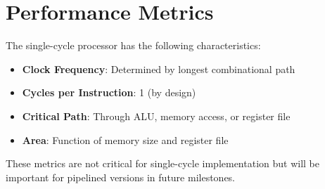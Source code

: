 \section{Performance Metrics}

The single-cycle processor has the following characteristics:

\begin{itemize}
    \item \textbf{Clock Frequency}: Determined by longest combinational path
    \item \textbf{Cycles per Instruction}: 1 (by design)
    \item \textbf{Critical Path}: Through ALU, memory access, or register file
    \item \textbf{Area}: Function of memory size and register file
\end{itemize}

These metrics are not critical for single-cycle implementation but will be important for pipelined versions in future milestones.

